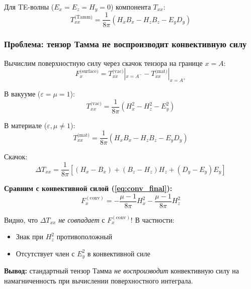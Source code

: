 \documentclass[a4paper,12pt]{article}
\begin{document}
Для TE-волны ($E_x = E_z = H_y = 0$) компонента $T_{xx}$:
\begin{equation}
T_{xx}^{\text{(Tamm)}} = \frac{1}{8\pi}\left(H_x B_x -  H_z B_z - E_y D_y\right)
\label{eq:tamm_txx}
\end{equation}

\subsubsection{Проблема: тензор Тамма не воспроизводит конвективную силу}

Вычислим поверхностную силу через скачок тензора на границе $x = A$:
\begin{equation}
F_x^{\text{(surface)}} = T_{xx}^{\text{(vac)}}|_{x=A^-} - T_{xx}^{\text{(mat)}}|_{x=A^+}
\label{eq:surface_force_tamm}
\end{equation}

В вакууме ($\varepsilon = \mu = 1$):
\begin{equation}
T_{xx}^{\text{(vac)}} = \frac{1}{8\pi}\left(H_x^2 - H_z^2 - E_y^2\right)
\end{equation}

В материале ($\varepsilon, \mu \neq 1$):
\begin{equation}
T_{xx}^{\text{(mat)}} = \frac{1}{8\pi}\left(H_x B_x -  H_z B_z - E_y D_y\right)
\end{equation}

Скачок:
\begin{equation}
\Delta T_{xx} = \frac{1}{8\pi}\left[(H_x - B_x) + (B_z - H_z) H_z + (D_y-E_y)E_y\right]
\label{eq:tamm_jump}
\end{equation}

\textbf{Сравним с конвективной силой (\ref{eq:conv_final}):}
\begin{equation}
F_x^{(\text{conv})} = -\frac{\mu - 1}{8\pi}H_x^2 - \frac{\mu - 1}{8\pi}H_z^2
\end{equation}

Видно, что $\Delta T_{xx}$ \textit{не совпадает} с $F_x^{(\text{conv})}$! В частности:
\begin{itemize}
    \item Знак при $H_z^2$ противоположный
    \item Отсутствует член с $E_y^2$ в конвективной силе
\end{itemize}

\textbf{Вывод:} стандартный тензор Тамма \textit{не воспроизводит} конвективную силу на намагниченность при вычислении поверхностного интеграла.
\end{document}

